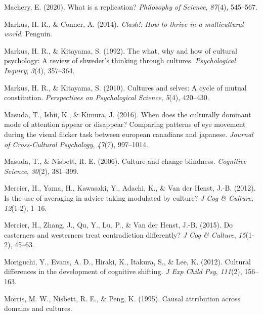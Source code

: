 \documentclass[
  man,floatsintext]{apa6}
\newlength{\cslhangindent}
\newlength{\cslentryspacingunit} %
\newenvironment{CSLReferences}[2] %
 {%
  \setlength{\parindent}{0pt}
  \ifodd #1
  \let\oldpar\par
  \def\par{\hangindent=\cslhangindent\oldpar}
  \fi
  \setlength{\parskip}{#2\cslentryspacingunit}
 }%
 {}
\begin{document}
\begin{CSLReferences}{1}{0}
\leavevmode{}%
Machery, E. (2020). What is a replication? \emph{Philosophy of Science}, \emph{87}(4), 545--567.

\leavevmode{}%
Markus, H. R., \& Conner, A. (2014). \emph{Clash!: How to thrive in a multicultural world}. Penguin.

\leavevmode{}%
Markus, H. R., \& Kitayama, S. (1992). The what, why and how of cultural psychology: A review of shweder's thinking through cultures. \emph{Psychological Inquiry}, \emph{3}(4), 357--364.

\leavevmode{}%
Markus, H. R., \& Kitayama, S. (2010). Cultures and selves: A cycle of mutual constitution. \emph{Perspectives on Psychological Science}, \emph{5}(4), 420--430.

\leavevmode{}%
Masuda, T., Ishii, K., \& Kimura, J. (2016). When does the culturally dominant mode of attention appear or disappear? Comparing patterns of eye movement during the visual flicker task between european canadians and japanese. \emph{Journal of Cross-Cultural Psychology}, \emph{47}(7), 997--1014.

\leavevmode{}%
Masuda, T., \& Nisbett, R. E. (2006). Culture and change blindness. \emph{Cognitive Science}, \emph{30}(2), 381--399.

\leavevmode{}%
Mercier, H., Yama, H., Kawasaki, Y., Adachi, K., \& Van der Henst, J.-B. (2012). Is the use of averaging in advice taking modulated by culture? \emph{J Cog \& Culture}, \emph{12}(1-2), 1--16.

\leavevmode{}%
Mercier, H., Zhang, J., Qu, Y., Lu, P., \& Van der Henst, J.-B. (2015). Do easterners and westerners treat contradiction differently? \emph{J Cog \& Culture}, \emph{15}(1-2), 45--63.

\leavevmode{}%
Moriguchi, Y., Evans, A. D., Hiraki, K., Itakura, S., \& Lee, K. (2012). Cultural differences in the development of cognitive shifting. \emph{J Exp Child Psy}, \emph{111}(2), 156--163.

\leavevmode{}%
Morris, M. W., Nisbett, R. E., \& Peng, K. (1995). Causal attribution across domains and cultures.


\end{CSLReferences}
\end{document}
